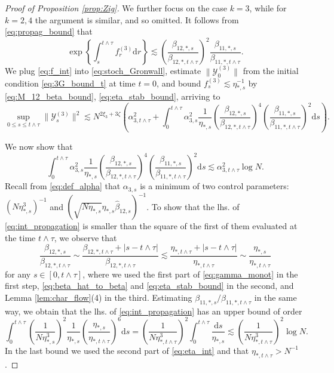 \documentclass[10pt]{amsart}
\numberwithin{equation}{section}
\newcommand{\dif}{\mathrm{d}}
\begin{document}
\begin{proof}[Proof of Proposition \ref{prop:Zig}]
We further focus on the case $k=3$, while for $k=2,4$ the argument is similar, and so omitted. It follows from \eqref{eq:propag_bound} that
\begin{equation}
\exp\left\lbrace\int_s^{t\wedge \tau}f_{r}^{(3)}\dif r\right\rbrace \lesssim \left(\frac{\beta_{12,*,s}}{\beta_{12,*,t\wedge\tau}}\right)^2 \frac{\beta_{11,*,s}}{\beta_{11,*,t\wedge\tau}}.
\label{eq:f_int}
\end{equation}
We plug \eqref{eq:f_int} into \eqref{eq:stoch_Gronwall}, estimate $\|\mathcal{Y}^{(3)}_0\|$ from the initial condition \eqref{eq:3G_bound_t} at time $t=0$, and bound $f_{s}^{(3)}\lesssim \eta_{*,s}^{-1}$ by \eqref{eq:M_12_beta_bound}, \eqref{eq:eta_stab_bound}, arriving to
\begin{equation}
\sup_{0\le s\le t\wedge \tau} \|\mathcal{Y}^{(3)}_s\|^2\lesssim N^{2\xi_3+3\zeta} \left(\alpha^2_{3,t\wedge\tau} + \int_0^{t\wedge\tau} \alpha_{3,s}^2 \frac{1}{\eta_{*,s}}\left(\frac{\beta_{12,*,s}}{\beta_{12,*,t\wedge\tau}}\right)^4 \left(\frac{\beta_{11,*,s}}{\beta_{11,*,t\wedge\tau}}\right)^2\dif s\right).
\label{eq:Gronwall_3G}
\end{equation}




We now show that
\begin{equation}
\int_0^{t\wedge\tau} \alpha_{3,s}^2 \frac{1}{\eta_{*,s}}\left(\frac{\beta_{12,*,s}}{\beta_{12,*,t\wedge\tau}}\right)^4 \left(\frac{\beta_{11,*,s}}{\beta_{11,*,t\wedge\tau}}\right)^2\dif s \lesssim \alpha_{3,t\wedge\tau}^2\log N.
\label{eq:int_propagation} 
\end{equation}
Recall from \eqref{eq:def_alpha} that $\alpha_{3,s}$ is a minimum of two control parameters: $(N\eta_{*,s}^3)^{-1}$ and $(\sqrt{N\eta_{*,s}}\eta_{*,s}\widehat{\beta}_{12,s})^{-1}$. To show that the lhs. of \eqref{eq:int_propagation} is smaller than the square of the first of them evaluated at the time $t\wedge \tau$, we observe that
\begin{equation}
\frac{\beta_{12,*,s}}{\beta_{12,*,t\wedge\tau}}\sim \frac{\beta_{12,*,t\wedge\tau}+|s-t\wedge\tau|}{\beta_{12,*,t\wedge\tau}}\lesssim  \frac{\eta_{*,t\wedge\tau}+|s-t\wedge\tau|}{\eta_{*,t\wedge\tau}}\sim \frac{\eta_{*,s}}{\eta_{*,t\wedge\tau}}
\label{eq:beta_ratio}
\end{equation}
for any $s\in [0,t\wedge\tau]$, where we used the first part of \eqref{eq:gamma_monot} in the first step, \eqref{eq:beta_hat_to_beta} and \eqref{eq:eta_stab_bound} in the second, and Lemma \ref{lem:char_flow}(4) in the third. Estimating $\beta_{11,*,s}/\beta_{11,*,t\wedge\tau}$ in the same way, we obtain that the lhs. of \eqref{eq:int_propagation} has an upper bound of order
\begin{equation}
\int_0^{t\wedge\tau} \left(\frac{1}{N\eta_{*,s}^3}\right)^2 \frac{1}{\eta_{*,s}}\left(\frac{\eta_{*,s}}{\eta_{*,t\wedge\tau}}\right)^6 \dif s = \left(\frac{1}{N\eta_{*,t\wedge\tau}^3}\right)^2 \int_0^{t\wedge\tau}\frac{\dif s}{\eta_{*,s}}\lesssim \left(\frac{1}{N\eta_{*,t\wedge\tau}^3}\right)^2\log N.
\label{eq:eta_propagation}
\end{equation}
In the last bound we used the second part of \eqref{eq:eta_int} and that $\eta_{*,t\wedge\tau}>N^{-1}$.



\end{proof}
\end{document}
